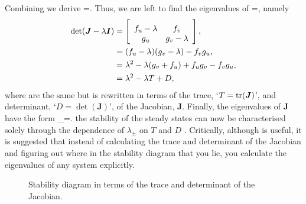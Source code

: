Combining  we derive
\bb
{}=. 
\ee
Thus, we are left to find the eigenvalues of
\bb
{}=,
\ee
namely
\begin{align}
\det(\bm{J}-\lambda \bm{I})&=\left[ \begin{array}{cc}\noalign{\medskip} f_u-\lambda&f_v\\
g_u&g_v-\lambda
\end {array} \right],\nonumber\\
&=(f_u-\lambda)(g_v-\lambda)-f_vg_u,\nonumber\\
&=\lambda^2-\lambda(g_v+f_u)+f_ug_v-f_vg_u\label{Aux_derivatives},\\
&=\lambda^2-\lambda T+D\label{Aux_Jacobian},
\end{align}
where  are the same but  is rewritten in terms of the trace, `$T=\textrm{tr}(\bm{J})$', and determinant, `$D=\det(\bm{J})$', of the Jacobian, $\bm{J}$. Finally, the eigenvalues of $\bm{J}$ have the form
\bb
\lambda_\pm=.
\ee
the stability of the steady states can now be characterised solely through the dependence of $\lambda_{\pm}$ on $T$ and $D$ . Critically, although  is useful, it is suggested that instead of calculating the trace and determinant of the Jacobian and figuring out where in the stability diagram that you lie, you calculate the eigenvalues of any system explicitly.
\begin{figure}[!!!h!!!tb]
\centering
{}
\caption{\label{TD_stability}Stability diagram in terms of the trace and determinant of the Jacobian.}
\end{figure}






